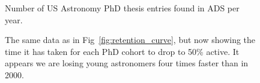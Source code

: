 \documentclass[preprint2]{aastex}
\begin{document}
\begin{figure}
  \caption{Number of US Astronomy PhD thesis entries found in ADS per year. \label{fig:phdperyear}}
\end{figure}


\begin{figure*}
  \caption{The fraction of Astronomy PhDs still active as first authors on any type of ADS entry (e.g., peer-reviewed journal articles, conference proceedings, grant proposals, arXive papers, etc).  Error bars show ranges computed by comparing the curves to those of authors with unique names and unique names where all records are assumed to be linked.   \label{fig:retention_curve}}
\end{figure*}

\begin{figure}
\caption{The same data as in Fig~\ref{fig:retention_curve}, but now showing the time it has taken for each PhD cohort to drop to 50\% active.  It appears we are losing young astronomers four times faster than in 2000.  \label{fig:retention_50}}
\end{figure}




\end{document}
